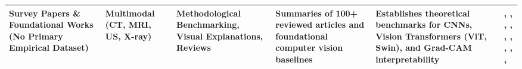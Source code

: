 \begin{longtable}{|L{2.7cm}|L{1.7cm}|L{2.4cm}|L{2.9cm}|L{3.8cm}|L{2.3cm}|}
\textbf{Survey Papers \& Foundational Works} \newline (No Primary Empirical Dataset) & 
Multimodal (CT, MRI, US, X-ray) & 
Methodological Benchmarking, Visual Explanations, Reviews & 
Summaries of 100+ reviewed articles and foundational computer vision baselines & 
Establishes theoretical benchmarks for CNNs, Vision Transformers (ViT, Swin), and Grad-CAM interpretability & 
\cite{litjens2017survey}, \cite{sloan2024automated}, \cite{kumar2024comprehensive}, \cite{aburass2025vision}, \cite{lecun2015deep}, \cite{kermany2018identifying}, \cite{dosovitskiy2020image}, \cite{liu2021swin}, \cite{selvaraju2017grad}, \cite{holzinger2019causability} \\
\hline

\end{longtable}
